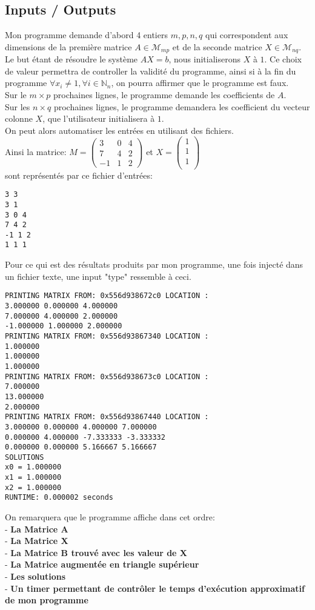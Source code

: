 \subsection{Inputs / Outputs}
Mon programme demande d'abord 4 entiers $m,p,n,q$ qui correspondent aux dimensions de la première matrice $A \in \mathcal{M}_{mp}$ et de la seconde matrice $X \in \mathcal{M}_{nq}$. Le but étant de résoudre le système $AX=b$, nous initialiserons $X$ à $1$. Ce choix de valeur permettra de controller la validité du programme, ainsi si à la fin du programme $\forall x_i \neq 1, \forall i \in \mathbb{N}_{n}$, on pourra affirmer que le programme est faux.  \\
Sur le $m\times p$ prochaines lignes, le programme demande les coefficients de $A$. \\
Sur les $n \times q$ prochaines lignes, le programme demandera les coefficient du vecteur colonne $X$, que l'utilisateur initialisera à $1$. \\
On peut alors automatiser les entrées en utilisant des fichiers. \\
Ainsi la matrice:
$ M = \begin{pmatrix}
3 & 0 & 4\\
7 & 4 & 2 \\
-1 & 1 & 2
\end{pmatrix}
$
et 
$ X = \begin{pmatrix}
1 \\
1 \\
1 \\
\end{pmatrix}
$ \\
sont représentés par ce fichier d'entrées:
\begin{lstlisting}[caption=input.txt]
3 3
3 1 
3 0 4
7 4 2
-1 1 2
1 1 1
\end{lstlisting}
Pour ce qui est des résultats produits par mon programme, une fois injecté dans un fichier texte, une input "type" ressemble à ceci. \\
\begin{lstlisting}[caption=Gauss elimination with M and X matrix]
PRINTING MATRIX FROM: 0x556d938672c0 LOCATION :
3.000000 0.000000 4.000000
7.000000 4.000000 2.000000
-1.000000 1.000000 2.000000
PRINTING MATRIX FROM: 0x556d93867340 LOCATION :
1.000000
1.000000
1.000000
PRINTING MATRIX FROM: 0x556d938673c0 LOCATION :
7.000000
13.000000
2.000000
PRINTING MATRIX FROM: 0x556d93867440 LOCATION :
3.000000 0.000000 4.000000 7.000000
0.000000 4.000000 -7.333333 -3.333332
0.000000 0.000000 5.166667 5.166667
SOLUTIONS
x0 = 1.000000
x1 = 1.000000
x2 = 1.000000
RUNTIME: 0.000002 seconds 
\end{lstlisting}
On remarquera que le programme affiche dans cet ordre: \\
- \textbf{La Matrice A} \\
- \textbf{La Matrice X} \\
- \textbf{La Matrice B trouvé avec les valeur de X} \\
- \textbf{La Matrice augmentée en triangle supérieur} \\
- \textbf{Les solutions} \\
- \textbf{Un timer permettant de contrôler le temps d'exécution approximatif de mon programme} 
